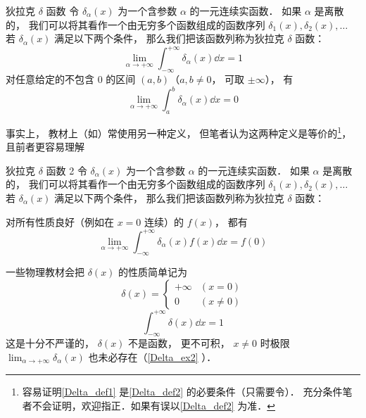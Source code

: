\begin{definition}{狄拉克 $\delta$ 函数}\label{Delta_def1}
令 $\delta_\alpha(x)$ 为一个含参数 $\alpha$ 的一元连续实函数． 如果 $\alpha$ 是离散的， 我们可以将其看作一个由无穷多个函数组成的函数序列 $\delta_1(x), \delta_2(x), \dots$ 若 $\delta_\alpha(x)$ 满足以下两个条件， 那么我们把该函数列称为狄拉克 $\delta$ 函数：
\begin{equation}\label{Delta_eq5}
\lim_{\alpha\to+\infty}\int_{-\infty}^{+\infty} \delta_\alpha(x) \dd{x} = 1
\end{equation}
对任意给定的不包含 0 的区间 $(a,b)$（$a,b \ne 0$， 可取 $\pm\infty$）， 有
\begin{equation}\label{Delta_eq4}
\lim_{\alpha\to+\infty} \int_{a}^{b} \delta_\alpha(x) \dd{x} = 0
\end{equation}
\end{definition}
事实上， 教材上（如\cite{Arfken}）常使用另一种定义， 但笔者认为这两种定义是等价的\footnote{容易证明\autoref{Delta_def1} 是\autoref{Delta_def2} 的必要条件（只需要令）． 充分条件笔者不会证明，欢迎指正．如果有误以\autoref{Delta_def2} 为准．}， 且前者更容易理解
\begin{definition}{狄拉克 $\delta$ 函数 2}\label{Delta_def2}
令 $\delta_\alpha(x)$ 为一个含参数 $\alpha$ 的一元连续实函数． 如果 $\alpha$ 是离散的， 我们可以将其看作一个由无穷多个函数组成的函数序列 $\delta_1(x), \delta_2(x), \dots$ 若 $\delta_\alpha(x)$ 满足以下两个条件， 那么我们把该函数列称为狄拉克 $\delta$ 函数：

对所有性质良好（例如在 $x = 0$ 连续）的 $f(x)$， 都有
\begin{equation}
\lim_{\alpha\to+\infty}\int_{-\infty}^{+\infty} \delta_\alpha(x)f(x) \dd{x} = f(0)
\end{equation}
\end{definition}

一些物理教材会把 $\delta(x)$ 的性质简单记为
\begin{equation}\label{Delta_eq2}
\delta(x) =
\begin{cases}
+\infty & (x = 0)\\
0 & (x \ne 0)
\end{cases}
\end{equation}
\begin{equation}\label{Delta_eq3}
\int_{-\infty}^{+\infty} \delta(x) \dd{x} = 1
\end{equation}
这是十分不严谨的， $\delta(x)$ 不是函数， 更不可积， $x \ne 0$ 时极限 $\lim_{\alpha\to+\infty}\delta_\alpha(x)$ 也未必存在（\autoref{Delta_ex2} ）．


